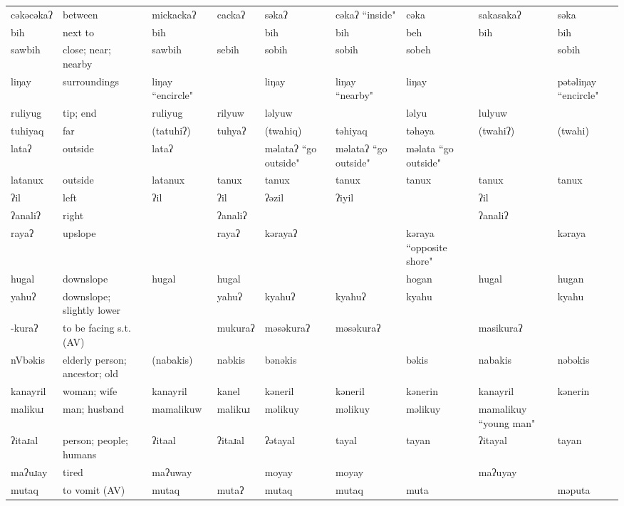 \begin{landscape}
\begin{longtable}{*{9}{p{}}}
\text{*}cəkəcəkaʔ & between & mickackaʔ & cackaʔ & səkaʔ & cəkaʔ ``inside" & cəka & sakasakaʔ & səka\\
\text{*}bih & next to & bih &  & bih & bih & beh & bih & bih\\
\text{*}sawbih & close; near; nearby & sawbih & sebih & sobih & sobih & sobeh &  & sobih\\
\text{*}liŋay & surroundings & liŋay ``encircle" &  & liŋay & liŋay ``nearby" & liŋay &  & pətəliŋay ``encircle"\\
\text{*}ruliyug & tip; end & ruliyug & rilyuw & ləlyuw &  & ləlyu & lulyuw & \\
\text{*}tuhiyaq & far & (tatuhiʔ) & tuhyaʔ & (twahiq) & təhiyaq & təhəya & (twahiʔ) & (twahi)\\
\text{*}lataʔ & outside & lataʔ &  & məlataʔ ``go outside" & məlataʔ ``go outside" & məlata ``go outside" &  & \\
\text{*}latanux & outside & latanux & tanux & tanux & tanux & tanux & tanux & tanux\\
\text{*}ʔil & left & ʔil & ʔil & ʔəzil & ʔiyil &  & ʔil & \\
\text{*}ʔanaliʔ & right &  & ʔanaliʔ &  &  &  & ʔanaliʔ & \\
\text{*}rayaʔ & upslope &  & rayaʔ & kərayaʔ &  & kəraya ``opposite shore" &  & kəraya\\
\text{*}hugal & downslope & hugal & hugal &  &  & hogan & hugal & hugan\\
\text{*}yahuʔ & downslope; slightly lower &  & yahuʔ & kyahuʔ & kyahuʔ & kyahu &  & kyahu\\
\text{*}-kuraʔ & to be facing s.t. (AV) &  & mukuraʔ & məsəkuraʔ & məsəkuraʔ &  & masikuraʔ & \\
\text{*}nVbəkis & elderly person; ancestor; old & (nabakis) & nabkis & bənəkis &  & bəkis & nabakis & nəbəkis\\
\text{*}kanayril & woman; wife & kanayril & kanel & kəneril & kəneril & kənerin & kanayril & kənerin\\
\text{*}malikuɹ & man; husband & mamalikuw & malikuɹ & məlikuy & məlikuy & məlikuy & mamalikuy ``young man" & \\
\text{*}ʔitaɹal & person; people; humans & ʔitaal & ʔitaɹal & ʔətayal & tayal & tayan & ʔitayal & tayan\\
\text{*}maʔuɹay & tired & maʔuway &  & moyay & moyay &  & maʔuyay & \\
\text{*}mutaq & to vomit (AV) & mutaq & mutaʔ & mutaq & mutaq & muta &  & məputa\\

\end{longtable}
\end{landscape}
